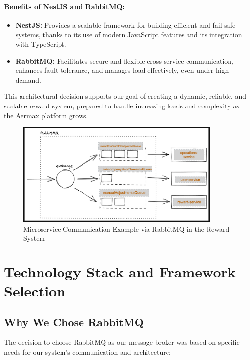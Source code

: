 \paragraph{Benefits of NestJS and RabbitMQ:}
\begin{itemize}
    \item \textbf{NestJS:} Provides a scalable framework for building efficient and fail-safe systems, thanks to its use of modern JavaScript features and its integration with TypeScript.
    \item \textbf{RabbitMQ:} Facilitates secure and flexible cross-service communication, enhances fault tolerance, and manages load effectively, even under high demand.
\end{itemize}

This architectural decision supports our goal of creating a dynamic, reliable, and scalable reward system, prepared to handle increasing loads and complexity as the Aermax platform grows.

\begin{figure}[H]
    \centering
    \includegraphics[width=0.9\textwidth]{src/assets/chapters/rmq.png}
    \caption{Microservice Communication Example via RabbitMQ in the Reward System}
    \label{fig:microservice_communication_rabbitmq}
\end{figure}

\section{Technology Stack and Framework Selection}

\subsection*{Why We Chose RabbitMQ}
The decision to choose RabbitMQ as our message broker was based on specific needs for our system's communication and architecture:

